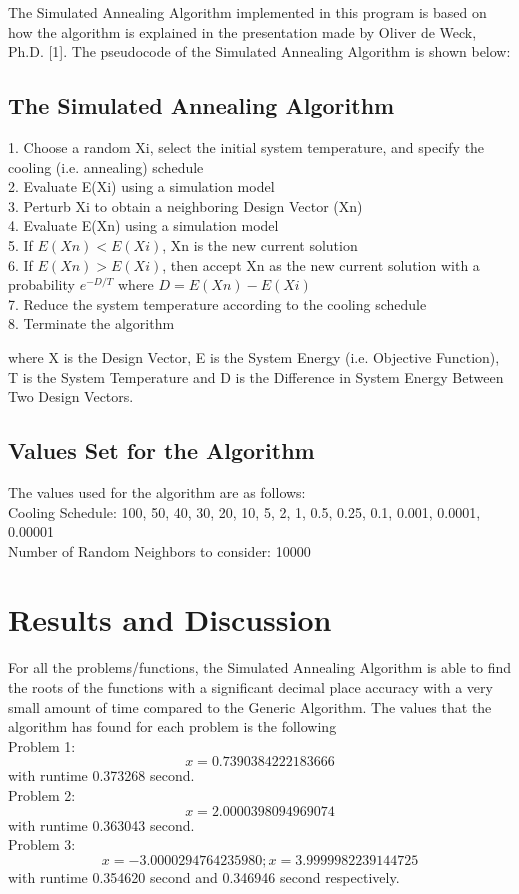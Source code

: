 \documentclass{acm_proc_article-sp}
\begin{document}
The Simulated Annealing Algorithm implemented in this program is based on how the algorithm is explained in the presentation made by Oliver de Weck, Ph.D. [1]. The pseudocode of the Simulated Annealing Algorithm is shown below:\\
\subsection{The Simulated Annealing Algorithm}
1. Choose a random Xi, select the initial system temperature, and specify the cooling (i.e. annealing) schedule\\
2. Evaluate E(Xi) using a simulation model\\
3. Perturb Xi to obtain a neighboring Design Vector (Xn)\\
4. Evaluate E(Xn) using a simulation model\\
5. If $E(Xn)< E(Xi)$, Xn is the new current solution\\
6. If $E(Xn)> E(Xi)$, then accept Xn as the new current solution with a probability $e^{-D/T}$ where $D = E(Xn) -E(Xi)$\\
7. Reduce the system temperature according to the cooling schedule\\
8. Terminate the algorithm

where X is the Design Vector, E is the System Energy (i.e. Objective Function), T is the System Temperature and D is the Difference in System Energy Between Two Design Vectors.

\subsection{Values Set for the Algorithm}
The values used for the algorithm are as follows:\\
Cooling Schedule: {100, 50, 40, 30, 20, 10, 5, 2, 1, 0.5, 0.25, 0.1, 0.001, 0.0001, 0.00001}\\
Number of Random Neighbors to consider: 10000

\section{Results and Discussion}
For all the problems/functions, the Simulated Annealing Algorithm is able to find the roots of the functions with a significant decimal place accuracy with a very small amount of time compared to the Generic Algorithm. The values that the algorithm has found for each problem is the following\\
Problem 1:
\begin{equation*}
x = 0.7390384222183666
\end{equation*}
with runtime 0.373268 second.\\
Problem 2:
\begin{equation*}
x = 2.0000398094969074
\end{equation*}
with runtime 0.363043 second.\\
Problem 3:
\begin{equation*}
x = -3.0000294764235980; x = 3.9999982239144725
\end{equation*}
with runtime 0.354620 second and 0.346946 second respectively.
\end{document}
